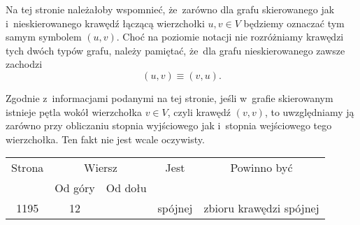 \documentclass[a4paper,11pt]{article}
\numberwithin{equation}{section}
\begin{document}
\VerSpaceFour





\noindent
{} Na tej stronie należałoby wspomnieć, że~zarówno dla grafu
skierowanego jak i~nieskierowanego krawędź łączącą wierzchołki $u, v \in V$
będziemy oznaczać tym samym symbolem $( u, v )$. Choć na poziomie notacji
nie rozróżniamy krawędzi tych dwóch typów grafu, należy pamiętać, że~dla
grafu nieskierowanego zawsze zachodzi
\begin{equation}
  \label{eq:CormenAtAl-WprowadzenieDoAlgorytmow-26}
  ( u, v ) \equiv ( v, u ).
\end{equation}

\VerSpaceFour





\noindent
{} Zgodnie z~informacjami podanymi na tej stronie, jeśli w~grafie
skierowanym istnieje pętla wokół wierzchołka $v \in V$, czyli krawędź
$( v, v )$, to uwzględniamy ją zarówno przy obliczaniu stopnia wyjściowego
jak i~stopnia wejściowego tego wierzchołka. Ten fakt nie jest wcale
oczywisty.

\VerSpaceFour











\newpage



\begin{center}

  \begin{tabular}{|c|c|c|c|c|}
    \hline
    Strona & \multicolumn{2}{c|}{Wiersz} & Jest
                              & Powinno być \\ \cline{2-3}
    & Od góry & Od dołu & & \\
    \hline
    1195 & 12 & & spójnej & zbioru krawędzi spójnej \\
    \hline
  \end{tabular}

\end{center}
\end{document}
